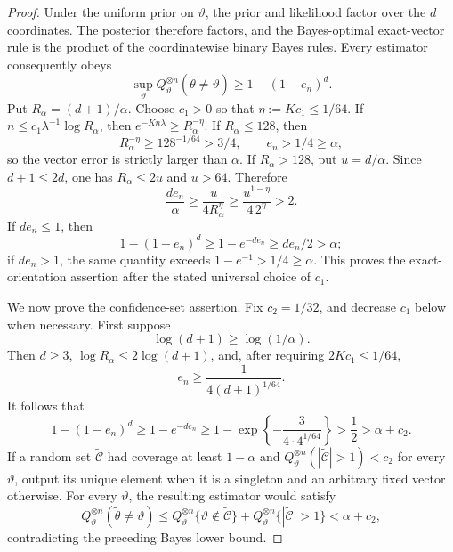 \documentclass{article}
\begin{document}
\begin{proof}
Under the uniform prior on \(\vartheta\), the prior and likelihood factor over the \(d\) coordinates.  The posterior therefore factors, and the Bayes-optimal exact-vector rule is the product of the coordinatewise binary Bayes rules.  Every estimator consequently obeys
\[
\sup_{\vartheta}Q_\vartheta^{\otimes n}(\widetilde\theta\ne\vartheta)
\ge1-(1-e_n)^d.
\]
Put \(R_\alpha=(d+1)/\alpha\).  Choose \(c_1>0\) so that \(\eta:=Kc_1\le1/64\).  If \(n\le c_1\lambda^{-1}\log R_\alpha\), then \(e^{-Kn\lambda}\ge R_\alpha^{-\eta}\).  If \(R_\alpha\le128\), then
\[
R_\alpha^{-\eta}\ge128^{-1/64}>3/4,\qquad e_n>1/4\ge\alpha,
\]
so the vector error is strictly larger than \(\alpha\).  If \(R_\alpha>128\), put \(u=d/\alpha\).  Since \(d+1\le2d\), one has \(R_\alpha\le2u\) and \(u>64\).  Therefore
\[
\frac{de_n}{\alpha}\ge\frac{u}{4R_\alpha^\eta}\ge
\frac{u^{1-\eta}}{4\,2^\eta}>2.
\]
If \(de_n\le1\), then
\[
1-(1-e_n)^d\ge1-e^{-de_n}\ge de_n/2>\alpha;
\]
if \(de_n>1\), the same quantity exceeds \(1-e^{-1}>1/4\ge\alpha\).  This proves the exact-orientation assertion after the stated universal choice of \(c_1\).

We now prove the confidence-set assertion.  Fix \(c_2=1/32\), and decrease \(c_1\) below when necessary.  First suppose
\[
\log(d+1)\ge\log(1/\alpha).
\]
Then \(d\ge3\), \(\log R_\alpha\le2\log(d+1)\), and, after requiring \(2Kc_1\le1/64\),
\[
e_n\ge\frac1{4(d+1)^{1/64}}.
\]
It follows that
\[
1-(1-e_n)^d\ge1-e^{-de_n}\ge
1-\exp\left\{-\frac{3}{4\cdot4^{1/64}}\right\}>\frac12>\alpha+c_2.
\]
If a random set \(\widetilde{\mathcal C}\) had coverage at least \(1-\alpha\) and \(Q_\vartheta^{\otimes n}(|\widetilde{\mathcal C}|>1)<c_2\) for every \(\vartheta\), output its unique element when it is a singleton and an arbitrary fixed vector otherwise.  For every \(\vartheta\), the resulting estimator would satisfy
\[
Q_\vartheta^{\otimes n}(\widetilde\theta\ne\vartheta)\le
Q_\vartheta^{\otimes n}\{\vartheta\notin\widetilde{\mathcal C}\}
+Q_\vartheta^{\otimes n}\{|\widetilde{\mathcal C}|>1\}<\alpha+c_2,
\]
contradicting the preceding Bayes lower bound.


\end{proof}
\end{document}
